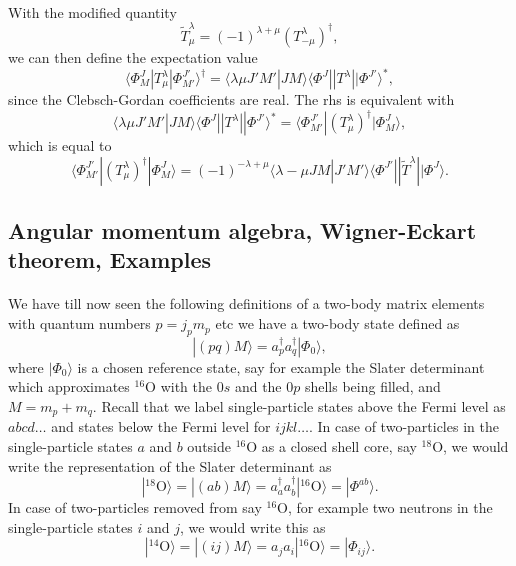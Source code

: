 \documentclass[%
twoside,                 %
final,                   %
10pt]{article}
\begin{document}
\paragraph{}
With the modified quantity 
\[
\tilde{T}^{\lambda}_{\mu}=(-1)^{\lambda+\mu}(T^{\lambda}_{-\mu})^{\dagger},
\]
we can then define the expectation value
\[
\langle \Phi^J_M|T^{\lambda}_{\mu}|\Phi^{J'}_{M'}\rangle^{\dagger} = \langle \lambda \mu J'M'|JM\rangle\langle \Phi^J||T^{\lambda}||\Phi^{J'}\rangle^*,
\]
since the Clebsch-Gordan coefficients are real. The rhs is equivalent with 
\[
\langle \lambda \mu J'M'|JM\rangle\langle \Phi^J||T^{\lambda}||\Phi^{J'}\rangle^*=\langle \Phi^{J'}_{M'}|(T^{\lambda}_{\mu})^{\dagger}|\Phi^{J}_{M}\rangle,
\]
which is equal to 
\[
\langle \Phi^{J'}_{M'}|(T^{\lambda}_{\mu})^{\dagger}|\Phi^{J}_{M}\rangle=(-1)^{-\lambda+\mu}\langle \lambda -\mu JM|J'M'\rangle\langle \Phi^{J'}||\tilde{T}^{\lambda}||\Phi^{J}\rangle.
\]



\subsection{Angular momentum algebra, Wigner-Eckart theorem, Examples}

\paragraph{}
We have till now seen the following definitions of a two-body matrix elements 
with quantum numbers $p=j_pm_p$ etc we have a two-body state defined as
\[
|(pq)M\rangle  = a^{\dagger}_pa^{\dagger}_q|\Phi_0\rangle,
\]
where $|\Phi_0\rangle$ is a chosen reference state, say for example the Slater determinant which approximates 
${}^{16}\mbox{O}$ with the $0s$ and the $0p$ shells being filled, and $M=m_p+m_q$. Recall that we label single-particle states above the Fermi level as $abcd\dots$ and states below the Fermi level for $ijkl\dots$.  
In case of two-particles in the single-particle states $a$ and $b$ outside ${}^{16}\mbox{O}$ as a closed shell core, say ${}^{18}\mbox{O}$, 
we would write the representation of the Slater determinant as
\[
|^{18}\mathrm{O}\rangle =|(ab)M\rangle  = a^{\dagger}_aa^{\dagger}_b|^{16}\mathrm{O}\rangle=|\Phi^{ab}\rangle.
\]
In case of two-particles removed from say ${}^{16}\mbox{O}$, for example two neutrons in the single-particle states $i$ and $j$, we would write this as
\[
|^{14}\mathrm{O}\rangle =|(ij)M\rangle  = a_ja_i|^{16}\mathrm{O}\rangle=|\Phi_{ij}\rangle.
\]
\end{document}

